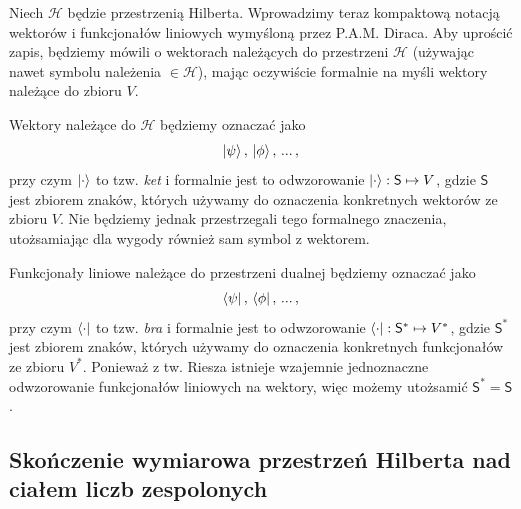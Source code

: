 \documentclass{myclass}
\begin{document}
Niech \(\mathscr{H}\) będzie przestrzenią Hilberta. Wprowadzimy teraz kompaktową notacją wektorów i
funkcjonałów liniowych wymyśloną przez P.A.M. Diraca. Aby uprościć zapis, będziemy mówili o
wektorach należących do przestrzeni \(\mathscr{H}\) (używając nawet symbolu należenia \(\in
\mathscr{H}\)), mając oczywiście formalnie na myśli wektory należące do zbioru \(V\).

Wektory należące do \(\mathscr{H}\) będziemy oznaczać jako
\begin{equation*}
    \ket{\psi},\, \ket{\phi},\, ...\,,
\end{equation*}
przy czym \(\ket{\cdot}\) to tzw. \textit{ket} i formalnie jest to odwzorowanie \(\ket{\cdot} :
\mathsf{S} \mapsto V\), gdzie \(\mathsf{S}\) jest zbiorem znaków, których używamy do oznaczenia
konkretnych wektorów ze zbioru \(V\). Nie będziemy jednak przestrzegali tego formalnego znaczenia,
utożsamiając dla wygody również  sam symbol z wektorem.

Funkcjonały liniowe należące do przestrzeni dualnej będziemy oznaczać jako
\begin{equation*}
    \bra{\psi},\, \bra{\phi},\, ...\,,
\end{equation*}
przy czym \(\bra{\cdot}\) to tzw. \textit{bra} i formalnie jest to odwzorowanie \(\bra{\cdot} :
\mathsf{S}^* \mapsto V^*\), gdzie \(\mathsf{S}^*\) jest zbiorem znaków, których używamy do
oznaczenia konkretnych funkcjonałów ze zbioru \(V^*\). Ponieważ z tw. Riesza istnieje wzajemnie
jednoznaczne odwzorowanie funkcjonałów liniowych na wektory, więc możemy utożsamić \(\mathsf{S}^* =
\mathsf{S}\).

\subsection{Skończenie wymiarowa przestrzeń Hilberta nad ciałem liczb zespolonych}
\end{document}
